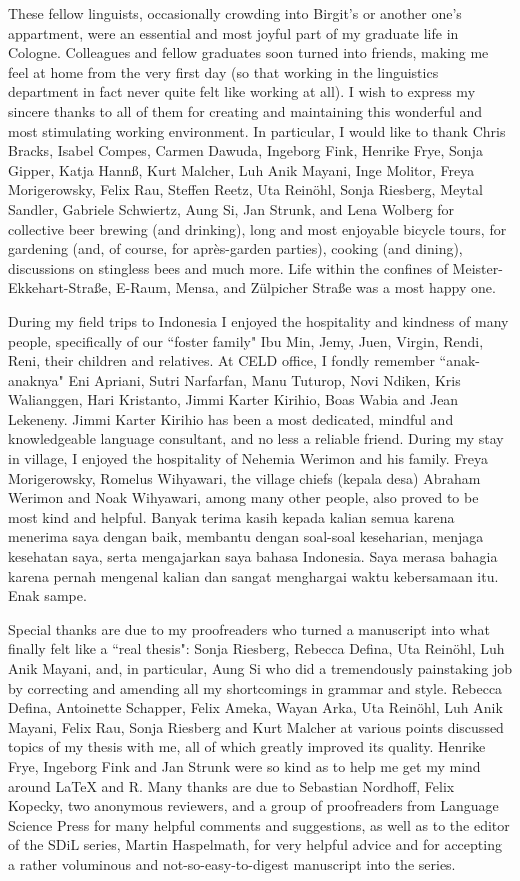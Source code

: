 These fellow linguists, occasionally crowding into Birgit's or another one's appartment, were an essential and most joyful part of my graduate life in Cologne. Colleagues and fellow graduates soon turned into friends, making me feel at home from the very first day (so that working in the linguistics department in fact never quite felt like working at all). I wish to express my sincere thanks to all of them for creating and maintaining this wonderful and most stimulating working environment. In particular, I would like to thank Chris Bracks, Isabel Compes, Carmen Dawuda, Ingeborg Fink, Henrike Frye, Sonja Gipper, Katja Hannß, Kurt Malcher, Luh Anik Mayani, Inge Molitor, Freya Morigerowsky, Felix Rau, Steffen Reetz, Uta Reinöhl, Sonja Riesberg, Meytal Sandler, Gabriele Schwiertz, Aung Si, Jan Strunk, and Lena Wolberg for collective beer brewing (and drinking), long and most enjoyable bicycle tours, for gardening (and, of course, for après-garden parties), cooking (and dining), discussions on stingless bees and much more. Life within the confines of Meister-Ekkehart-Straße, E-Raum, Mensa, and Zülpicher Straße was a most happy one.

During my field trips to Indonesia I enjoyed the hospitality and kindness of many people, specifically of our ``foster family" Ibu Min,  Jemy, Juen, Virgin, Rendi, Reni, their children and relatives. At CELD office, I fondly remember ``anak-anaknya" Eni Apriani, Sutri Narfarfan, Manu Tuturop, Novi Ndiken, Kris Walianggen, Hari Kristanto, Jimmi Karter Kirihio, Boas Wabia and Jean Lekeneny. Jimmi Karter Kirihio has been a most dedicated, mindful and knowledgeable language consultant, and no less a reliable friend. During my stay in  village, I enjoyed the hospitality of Nehemia Werimon and his family. Freya Morigerowsky,  Romelus Wihyawari, the village chiefs (kepala desa) Abraham Werimon and Noak Wihyawari, among many other people, also proved to be most kind and helpful. Banyak terima kasih kepada kalian semua karena menerima saya dengan baik, membantu dengan soal-soal keseharian, menjaga kesehatan saya, serta mengajarkan saya bahasa Indonesia. Saya merasa bahagia karena pernah mengenal kalian dan sangat menghargai waktu kebersamaan itu. Enak sampe.

Special thanks are due to my proofreaders who turned a manuscript into what finally felt like a ``real thesis": Sonja Riesberg, Rebecca Defina, Uta Reinöhl, Luh Anik Mayani, and, in particular, Aung Si who did a tremendously painstaking job by correcting and amending all my shortcomings in grammar and style. Rebecca Defina, Antoinette Schapper, Felix Ameka, Wayan Arka, Uta Reinöhl, Luh Anik Mayani, Felix Rau, Sonja Riesberg and Kurt Malcher at various points discussed topics of my thesis with me, all of which greatly improved its quality. Henrike Frye, Ingeborg Fink and Jan Strunk were so kind as to help me get my mind around LaTeX and R. Many thanks are due to Sebastian Nordhoff, Felix Kopecky, two anonymous reviewers, and a group of proofreaders from Language Science Press for many helpful comments and suggestions, as well as to the editor of the SDiL series, Martin Haspelmath, for very helpful advice and for accepting a rather voluminous and not-so-easy-to-digest manuscript into the series.

